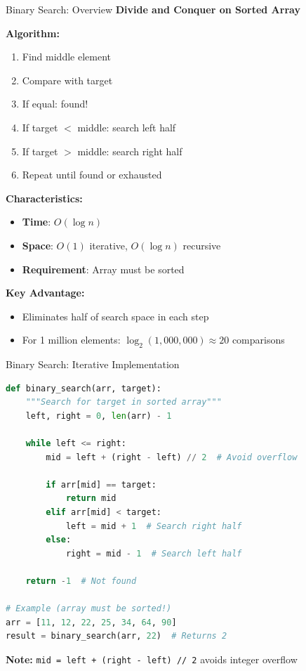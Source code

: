 \documentclass[aspectratio=169]{beamer}
\begin{document}
\begin{frame}{Binary Search: Overview}
  \textbf{Divide and Conquer on Sorted Array}

  \vspace{0.3cm}
  \textbf{Algorithm:}
  \begin{enumerate}
    \item Find middle element
    \item Compare with target
    \item If equal: found!
    \item If target $<$ middle: search left half
    \item If target $>$ middle: search right half
    \item Repeat until found or exhausted
  \end{enumerate}

  \vspace{0.3cm}
  \textbf{Characteristics:}
  \begin{itemize}
    \item \textbf{Time}: $O(\log n)$
    \item \textbf{Space}: $O(1)$ iterative, $O(\log n)$ recursive
    \item \textbf{Requirement}: Array must be sorted
  \end{itemize}

  \vspace{0.3cm}
  \textbf{Key Advantage:}
  \begin{itemize}
    \item Eliminates half of search space in each step
    \item For 1 million elements: $\log_2(1,000,000) \approx 20$ comparisons
  \end{itemize}
\end{frame}

\begin{frame}[fragile]{Binary Search: Iterative Implementation}
\begin{lstlisting}[language=Python, basicstyle=\ttfamily\tiny]
def binary_search(arr, target):
    """Search for target in sorted array"""
    left, right = 0, len(arr) - 1

    while left <= right:
        mid = left + (right - left) // 2  # Avoid overflow

        if arr[mid] == target:
            return mid
        elif arr[mid] < target:
            left = mid + 1  # Search right half
        else:
            right = mid - 1  # Search left half

    return -1  # Not found

# Example (array must be sorted!)
arr = [11, 12, 22, 25, 34, 64, 90]
result = binary_search(arr, 22)  # Returns 2
\end{lstlisting}

\textbf{Note:} \texttt{mid = left + (right - left) // 2} avoids integer overflow
\end{frame}
\end{document}
